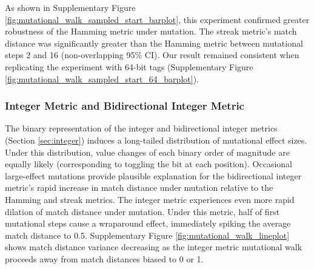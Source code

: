 As shown in Supplementary Figure \ref{fig:mutational_walk_sampled_start_barplot}, this experiment confirmed greater robustness of the Hamming metric under mutation.
The streak metric's match distance was significantly greater than the Hamming metric between mutational steps 2 and 16 (non-overlapping 95\% CI).
Our result remained consistent when replicating the experiment with 64-bit tags (Supplementary Figure \ref{fig:mutational_walk_sampled_start_64_barplot}).

\subsubsection{Integer Metric and Bidirectional Integer Metric}
\label{sec:mutation_integer}

The binary representation of the integer and bidirectional integer metrics (Section \ref{sec:integer}) induces a long-tailed distribution of mutational effect sizes.
Under this distribution, value changes of each binary order of magnitude are equally likely (corresponding to toggling the bit at each position).
Occasional large-effect mutations provide plausible explanation for the bidirectional integer metric's rapid increase in match distance under mutation relative to the Hamming and streak metrics.
The integer metric experiences even more rapid dilation of match distance under mutation.
Under this metric, half of first mutational steps cause a wraparound effect, immediately spiking the average match distance to 0.5.
Supplementary Figure \ref{fig:mutational_walk_lineplot} shows match distance variance decreasing as the integer metric mutational walk proceeds away from match distances biased to 0 or 1.
